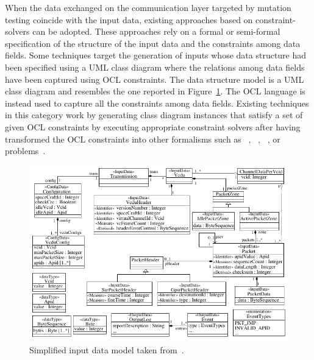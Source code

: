 When the data exchanged on the communication layer targeted by mutation testing coincide with the input data, existing approaches based on constraint-solvers can be adopted.
These approaches rely on a formal or semi-formal specification of the structure of the input data and the constraints among data fields.
Some techniques target the generation of inputs whose data structure had been specified using a UML class diagram where the relations among data fields have been captured using OCL constraints. The data structure model is a UML class diagram and resembles the one reported in Figure~\ref{fig:dataModel}. The OCL language is instead used to capture all the constraints among data fields. Existing techniques in this category work by generating class diagram instances that satisfy a set of given OCL constraints by executing appropriate constraint solvers after having transformed the OCL constraints into other formalisms such as ~\cite{Uml2alloy}, ~\cite{EMFTOCSP}, ~\cite{Przigoda2016}, or  problems~\cite{Soeken2011}.

\begin{figure}[t!]
 \centering
   \includegraphics{images/classDiagramSmall}
     \caption{Simplified input data model taken from~\cite{di2015evolutionary}.}
     \label{fig:dataModel}
\end{figure}

